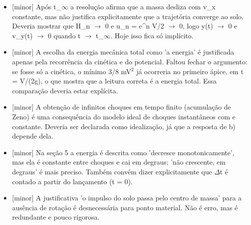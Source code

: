 \documentclass{article}%
\begin{document}
\begin{itemize}%
\item%
{[}minor{]} Após t\_$\infty$ a resolução afirma que a massa desliza com v\_x constante, mas não justifica explicitamente que a trajetória converge ao solo. Deveria mostrar que H\_n $\to$ 0 e u\_n = e\^{}n V/2 $\to$ 0, logo y(t) $\to$ 0 e v\_y(t) $\to$ 0 quando t $\to$ t\_$\infty$. Hoje isso fica só implícito.%
\item%
{[}minor{]} A escolha da energia mecânica total como 'a energia' é justificada apenas pela recorrência da cinética e do potencial. Faltou fechar o argumento: se fosse só a cinética, o mínimo 3/8 mV$^2$ já ocorreria no primeiro ápice, em t = V/(2g), o que mostra que a leitura correta é a energia total. Essa comparação deveria estar explícita.%
\item%
{[}minor{]} A obtenção de infinitos choques em tempo finito (acumulação de Zeno) é uma consequência do modelo ideal de choques instantâneos com e constante. Deveria ser declarada como idealização, já que a resposta de b) depende dela.%
\item%
{[}minor{]} Na seção 5 a energia é descrita como 'decresce monotonicamente', mas ela é constante entre choques e cai em degraus; 'não crescente, em degraus' é mais preciso. Também convém dizer explicitamente que $\Delta$t é contado a partir do lançamento (t = 0).%
\item%
{[}minor{]} A justificativa 'o impulso do solo passa pelo centro de massa' para a ausência de rotação é desnecessária para ponto material. Não é erro, mas é redundante e pouco rigorosa.%
\end{itemize}%
\end{document}
